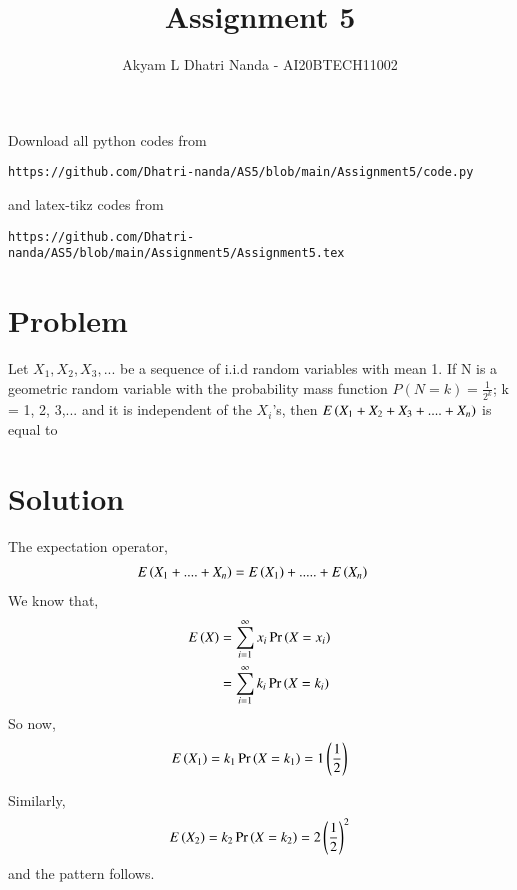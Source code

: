 \documentclass[journal,12pt,twocolumn]{IEEEtran}
\begin{document}
     \def\rightbox#1{\makebox[0in][r]{#1}}
     \def\centbox#1{\makebox[0in]{#1}}
     \def\topbox#1{\raisebox{-\baselineskip}[0in][0in]{#1}}
     \def\midbox#1{\raisebox{-0.5\baselineskip}[0in][0in]{#1}}
\vspace{3cm}
\title{Assignment 5}
\author{Akyam L Dhatri Nanda - AI20BTECH11002}
\maketitle
\newpage
\bigskip
\renewcommand{\thefigure}{\theenumi}
\renewcommand{\thetable}{\theenumi}
Download all python codes from 
\begin{lstlisting}
https://github.com/Dhatri-nanda/AS5/blob/main/Assignment5/code.py
\end{lstlisting}
%
and latex-tikz codes from 
%
\begin{lstlisting}
https://github.com/Dhatri-nanda/AS5/blob/main/Assignment5/Assignment5.tex
\end{lstlisting}
\section{Problem}
Let $X_1, X_2, X_3,...$ be a sequence of i.i.d random variables with mean 1. If N is a geometric random variable with the probability mass function $P(N = k) = \frac{1}{2^k}$; k = 1, 2, 3,... and it is independent of the $X_i$'s, then $E\left(X_1 + X_2 + X_3 +....+ X_n\right)$ is equal to 

\section{Solution}
The expectation operator, 
\begin{align}
    E\left(X_1 + .... + X_n\right)
    &= E\left(X_1\right) +.....+ E\left(X_n\right) \label{eq 2.0.1}
\end{align}
We know that, 
\begin{align}
    E\left(X\right) 
    &= \sum_{i = 1}^\infty x_i\Pr\left(X = x_i\right)\\
    &=  \sum_{i = 1}^\infty k_i\Pr\left(X = k_i\right) \label{eq 2.0.3}
\end{align}
So now, 
\begin{align}
    E\left(X_1\right) = k_1\Pr\left(X = k_1\right) = 1 \left(\frac{1}{2}\right) \label{eq 2.0.4}
\end{align}

Similarly, 
\begin{align}
    E\left(X_2\right) = k_2\Pr\left(X = k_2\right) = 2 \left(\frac{1}{2}\right)^{2} \label{eq 2.0.5}
\end{align}
and the pattern follows.
\end{document}

